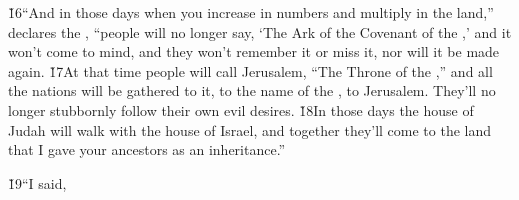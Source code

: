 \v{16}``And in those days when you increase in numbers and multiply in the land,'' declares the , ``people will no longer say, `The Ark of the Covenant of the ,' and it won't come to mind, and they won't remember it or miss it, nor will it be made again. \v{17}At that time people will call Jerusalem, ``The Throne of the ,'' and all the nations will be gathered to it, to the name of the , to Jerusalem. They'll no longer stubbornly follow their own evil desires. \v{18}In those days the house of Judah will walk with the house of Israel, and together they'll come to the land that I gave your ancestors as an inheritance.''

\v{19}``I said,


